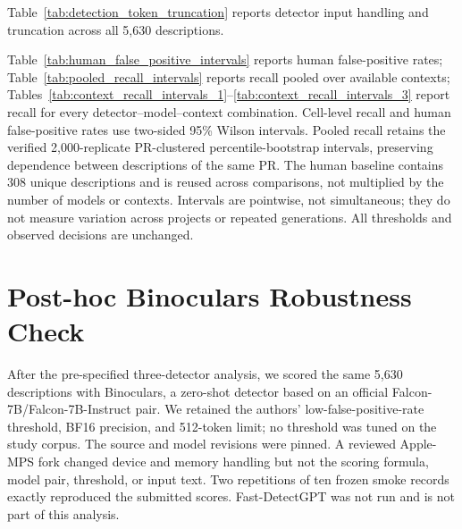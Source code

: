 \documentclass[11pt,a4paper]{article}
\newcommand{\binocularsDetector}{Binoculars}
\begin{document}
Table~\ref{tab:detection_token_truncation} reports detector input handling and truncation across all 5,630 descriptions.



Table~\ref{tab:human_false_positive_intervals} reports human false-positive rates;
Table~\ref{tab:pooled_recall_intervals} reports recall pooled over available contexts;
Tables~\ref{tab:context_recall_intervals_1}--\ref{tab:context_recall_intervals_3} report
recall for every detector--model--context combination.
Cell-level recall and human false-positive rates use two-sided 95\% Wilson intervals.
Pooled recall retains the verified 2,000-replicate PR-clustered percentile-bootstrap
intervals, preserving dependence between descriptions of the same PR. The human baseline
contains 308 unique descriptions and is reused across comparisons, not multiplied by
the number of models or contexts. Intervals are pointwise, not simultaneous; they do not
measure variation across projects or repeated generations. All thresholds and observed
decisions are unchanged.



\section{Post-hoc Binoculars Robustness Check}

After the pre-specified three-detector analysis, we scored the same 5,630 descriptions with
\binocularsDetector, a zero-shot detector based on an official Falcon-7B/Falcon-7B-Instruct
pair. We retained the authors' low-false-positive-rate threshold, BF16 precision, and 512-token
limit; no threshold was tuned on the study corpus. The source and model revisions were pinned.
A reviewed Apple-MPS fork changed device and memory handling but not the scoring formula,
model pair, threshold, or input text. Two repetitions of ten frozen smoke records exactly
reproduced the submitted scores. Fast-DetectGPT was not run and is not part of this analysis.
\end{document}
